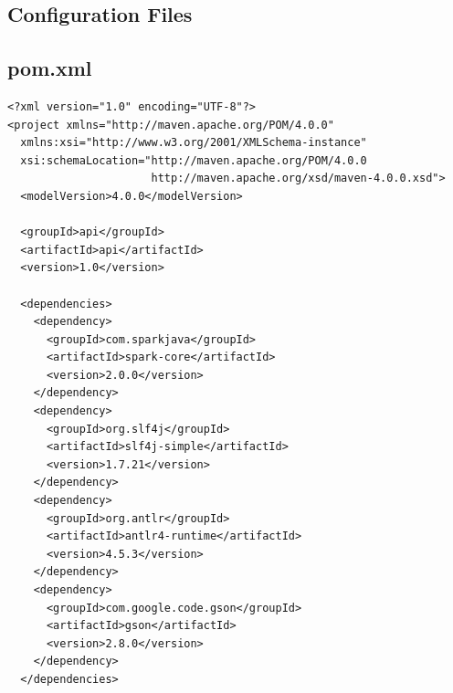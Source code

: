 \documentclass{l4proj}
\begin{document}
\begin{appendices}
\chapter{Configuration Files}
\section{pom.xml}
\label{sec:pom.xml}
\begin{lstlisting}
<?xml version="1.0" encoding="UTF-8"?>
<project xmlns="http://maven.apache.org/POM/4.0.0"
  xmlns:xsi="http://www.w3.org/2001/XMLSchema-instance"
  xsi:schemaLocation="http://maven.apache.org/POM/4.0.0
                      http://maven.apache.org/xsd/maven-4.0.0.xsd">
  <modelVersion>4.0.0</modelVersion>

  <groupId>api</groupId>
  <artifactId>api</artifactId>
  <version>1.0</version>

  <dependencies>
    <dependency>
      <groupId>com.sparkjava</groupId>
      <artifactId>spark-core</artifactId>
      <version>2.0.0</version>
    </dependency>
    <dependency>
      <groupId>org.slf4j</groupId>
      <artifactId>slf4j-simple</artifactId>
      <version>1.7.21</version>
    </dependency>
    <dependency>
      <groupId>org.antlr</groupId>
      <artifactId>antlr4-runtime</artifactId>
      <version>4.5.3</version>
    </dependency>
    <dependency>
      <groupId>com.google.code.gson</groupId>
      <artifactId>gson</artifactId>
      <version>2.8.0</version>
    </dependency>
  </dependencies>


\end{lstlisting}
\end{appendices}
\end{document}
